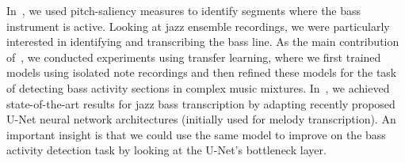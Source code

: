 \documentclass[11pt,a4paper]{article}
\theoremstyle{plain} \newtheorem{define}{Definition}[section]
\begin{document}
\begin{enumerate}
%
In~\cite{AbesserBM18_BassSaliency_ISMIR,AbesserM21_JazzBassTranscription_Electronics}, we used pitch-saliency measures to identify segments where the bass instrument is active. Looking at jazz ensemble recordings, we were particularly interested in identifying and transcribing the bass line. As the main contribution of~\cite{AbesserBM18_BassSaliency_ISMIR}, we conducted experiments using transfer learning, where we first trained models using isolated note recordings and then refined these models for the task of detecting bass activity sections in complex music mixtures.
%
In~\cite{AbesserM21_JazzBassTranscription_Electronics}, we achieved state-of-the-art results for jazz bass transcription by adapting recently proposed U-Net neural network architectures (initially used for melody transcription). An important insight is that we could use the same model to improve on the bass activity detection task by looking at the U-Net's bottleneck layer.


\end{enumerate}
\end{document}
